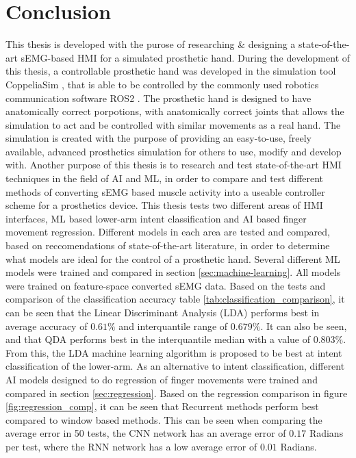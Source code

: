 \documentclass[../main.tex]{subfiles}
\begin{document}
\section{Conclusion}

This thesis is developed with the purose of researching \& designing a state-of-the-art sEMG-based HMI for a simulated prosthetic hand.
During the development of this thesis, a controllable prosthetic hand was developed in the simulation tool CoppeliaSim \cite{coppeliasim}, that is able to be controlled by the commonly used robotics communication software ROS2 \cite{ros2}.
The prosthetic hand is designed to have anatomically correct porpotions, with anatomically correct joints that allows the simulation to act and be controlled with similar movements as a real hand. 
The simulation is created with the purpose of providing an easy-to-use, freely available, advanced prosthetics simulation for others to use, modify and develop with. 
Another purpose of this thesis is to research and test state-of-the-art HMI techniques in the field of AI and ML, in order to compare and test different methods of converting sEMG based muscle activity into a useable controller scheme for a prosthetics device.
This thesis tests two different areas of HMI interfaces, ML based lower-arm intent classification and AI based finger movement regression.
Different models in each area are tested and compared, based on reccomendations of state-of-the-art
literature, in order to determine what models are ideal for the control of a prosthetic hand.
Several different ML models were trained and compared in section \ref{sec:machine-learning}.
All models were trained on feature-space converted sEMG data.
Based on the tests and comparison of the classification accuracy table \ref{tab:classification_comparison}, it can be seen that the Linear Discriminant Analysis (LDA) performs best in average accuracy of $0.61\%$ and interquantile range of $0.679\%$.
It can also be seen, and that QDA performs best in the interquantile median with a value of $0.803\%$.
From this, the LDA machine learning algorithm is proposed to be best at intent classification of the lower-arm.
As an alternative to intent classification, different AI models designed to do regression of finger movements were trained and compared in section \ref{sec:regression}.
Based on the regression comparison in figure \ref{fig:regression_comp}, it can be seen that Recurrent methods perform best compared to window based methods.
This can be seen when comparing the average error in 50 tests, the CNN network has an average error of $0.17$ Radians per test, where the RNN network has a low average error of $0.01$ Radians.
\end{document}
